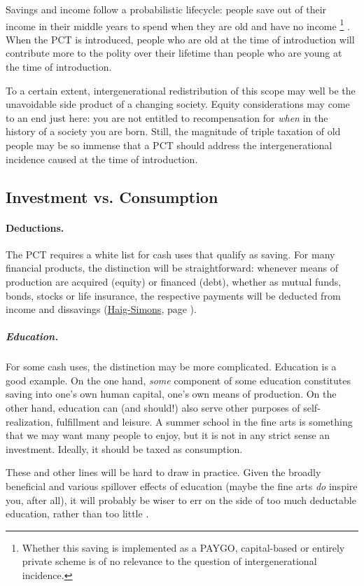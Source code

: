 Savings and income follow a probabilistic lifecycle:
people save out of their income in their middle years to spend when they are old and have no income
\footnote{
	Whether this saving is implemented as a PAYGO, capital-based or entirely private scheme is of no relevance to the question of intergenerational incidence.
}
.
When the PCT is introduced, people who are old at the time of introduction will contribute more to the polity over their lifetime than people who are young at the time of introduction.

To a certain extent, intergenerational redistribution of this scope may well be the unavoidable side product of a changing society.
Equity considerations may come to an end just here:
you are not entitled to recompensation for \emph{when} in the history of a society you are born.
Still, the magnitude of triple taxation of old people may be so immense that a PCT should address the intergenerational incidence caused at the time of introduction.

\subsection{Investment vs.
Consumption}
\paragraph{Deductions.} The PCT requires a white list for cash uses that qualify as saving.
For many financial products, the distinction will be straightforward:
whenever means of production are acquired (equity) or financed (debt), whether as mutual funds, bonds, stocks or life insurance, the respective payments will be deducted from income and dissavings (\hyperref[eq:HaigSimonsPCT]{Haig-Simons}, page \pageref{eq:HaigSimonsPCT}).

\subparagraph{Education.} For some cash uses, the distinction may be more complicated.
Education is a good example.
On the one hand, \emph{some} component of some education constitutes saving into one's own human capital, one's own means of production.
On the other hand, education can (and should!) also serve other purposes of self-realization, fulfillment and leisure.
A summer school in the fine arts is something that we may want many people to enjoy, but it is not in any strict sense an investment.
Ideally, it should be taxed as consumption.

These and other lines will be hard to draw in practice.
Given the broadly beneficial and various spillover effects of education (maybe the fine arts \emph{do} inspire you, after all), it will probably be wiser to err on the side of too much deductable education, rather than too little \citep[8]{Seidman1997}.

